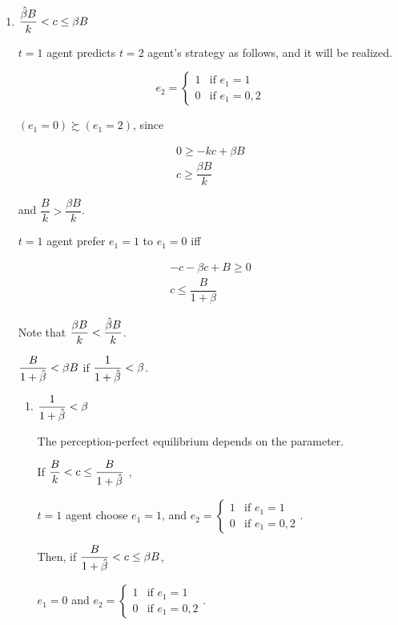 \documentclass{jsarticle}
\begin{document}
\begin{enumerate}
\begin{enumerate}
\begin{itemize}
\begin{enumerate}
  \item $\dfrac{\Hat{\beta }B}{k} < c \leq \beta B$
  
   $t=1$ agent predicts $t=2$ agent's strategy as follows, and it will be realized.
 
  \[e_2 = \begin{cases}
  1 & \text{if } e_1=1 \\
 0 & \text{if } e_1=0,2
 \end{cases} \]
 
 $(e_1=0) \succsim (e_1=2)$, since
 
  \begin{align*}
  0 \geq -kc + \beta B \\
  c \geq \dfrac{\beta B}{k}
  \end{align*}
 
 and $ \dfrac{B}{k} > \dfrac{\beta B}{k}$.
 
 \newpage
 
 $t=1$ agent prefer $e_1=1$ to $e_1=0$ iff
 
  \begin{align*}
  -c - \beta c + B \geq 0 \\
  c \leq \dfrac{B}{1+\beta}
  \end{align*}
  
  Note that $\dfrac{\beta B}{k} < \dfrac{\Hat{\beta} B}{k}$.
  
  $\dfrac{B}{1 + \Hat{\beta}} < \beta B$ if $\dfrac{1}{1 + \Hat{\beta}} < \beta$.
  
  \vspace{1.5zw}
  
  \begin{enumerate}
  
  \item $\dfrac{1}{1 + \Hat{\beta}} < \beta$
  
  The perception-perfect equilibrium depends on the parameter.
  
  If $\dfrac{B}{k} < c \leq \dfrac{B}{1+\Hat{\beta}}$ ,
  
  $t=1$ agent choose $e_1=1$, and $e_2 = \begin{cases}
  1 & \text{if } e_1=1 \\
  0 & \text{if } e_1=0,2
  \end{cases}$.
  
  Then, if $\dfrac{B}{1+\Hat{\beta}} < c \leq \beta B$,
  
  $e_1=0$ and $e_2 = \begin{cases}
  1 & \text{if } e_1=1 \\
  0 & \text{if } e_1=0,2
  \end{cases}$.
  

\end{enumerate}
\end{enumerate}
\end{itemize}
\end{enumerate}
\end{enumerate}
\end{document}
